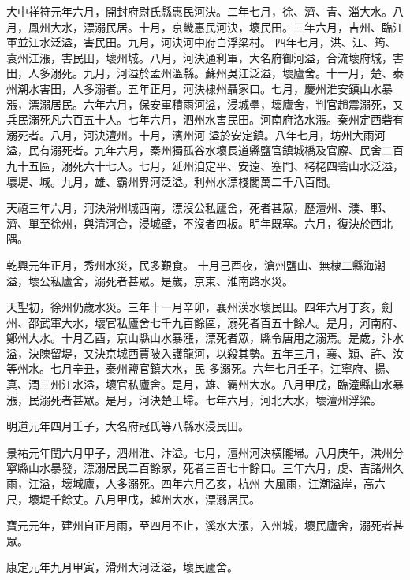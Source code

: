 \begin{pinyinscope}
 大中祥符元年六月，開封府尉氏縣惠民河決。二年七月，徐、濟、青、淄大水。八月，鳳州大水，漂溺民居。十月，京畿惠民河決，壞民田。三年六月，吉州、臨江軍並江水泛溢，害民田。九月，河決河中府白浮梁村。
 四年七月，洪、江、筠、袁州江漲，害民田，壞州城。八月，河決通利軍，大名府御河溢，合流壞府城，害田，人多溺死。九月，河溢於孟州溫縣。蘇州吳江泛溢，壞廬舍。十一月，楚、泰州潮水害田，人多溺者。五年正月，河決棣州聶家口。七月，慶州淮安鎮山水暴漲，漂溺居民。六年六月，保安軍積雨河溢，浸城壘，壞廬舍，判官趙震溺死，又兵民溺死凡六百五十人。七年六月，泗州水害民田。河南府洛水漲。秦州定西砦有溺死者。八月，河決澶州。十月，濱州河
 溢於安定鎮。八年七月，坊州大雨河溢，民有溺死者。九年六月，秦州獨孤谷水壞長道縣鹽官鎮城橋及官廨、民舍二百九十五區，溺死六十七人。七月，延州洎定平、安遠、塞門、栲栳四砦山水泛溢，壞堤、城。九月，雄、霸州界河泛溢。利州水漂棧閣萬二千八百間。



 天禧三年六月，河決滑州城西南，漂沒公私廬舍，死者甚眾，歷澶州、濮、鄆、濟、單至徐州，與清河合，浸城壁，不沒者四板。明年既塞。六月，復決於西北隅。



 乾興元年正月，秀州水災，民多艱食。
 十月己酉夜，滄州鹽山、無棣二縣海潮溢，壞公私廬舍，溺死者甚眾。是歲，京東、淮南路水災。



 天聖初，徐州仍歲水災。三年十一月辛卯，襄州漢水壞民田。四年六月丁亥，劍州、邵武軍大水，壞官私廬舍七千九百餘區，溺死者百五十餘人。是月，河南府、鄭州大水。十月乙酉，京山縣山水暴漲，漂死者眾，縣令唐用之溺焉。是歲，汴水溢，決陳留堤，又決京城西賈陂入護龍河，以殺其勢。五年三月，襄、穎、許、汝等州水。七月辛丑，泰州鹽官鎮大水，民
 多溺死。六年七月壬子，江寧府、揚、真、潤三州江水溢，壞官私廬舍。是月，雄、霸州大水。八月甲戌，臨潼縣山水暴漲，民溺死者甚眾。是月，河決楚王埽。七年六月，河北大水，壞澶州浮梁。



 明道元年四月壬子，大名府冠氏等八縣水浸民田。



 景祐元年閏六月甲子，泗州淮、汴溢。七月，澶州河決橫隴埽。八月庚午，洪州分寧縣山水暴發，漂溺居民二百餘家，死者三百七十餘口。三年六月，虔、吉諸州久雨，江溢，壞城廬，人多溺死。四年六月乙亥，杭州
 大風雨，江潮溢岸，高六尺，壞堤千餘丈。八月甲戌，越州大水，漂溺居民。



 寶元元年，建州自正月雨，至四月不止，溪水大漲，入州城，壞民廬舍，溺死者甚眾。



 康定元年九月甲寅，滑州大河泛溢，壞民廬舍。




\end{pinyinscope}
